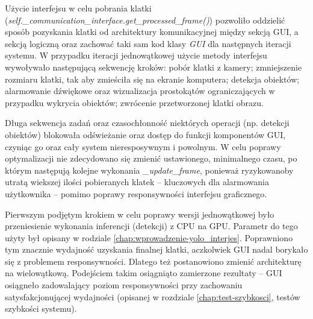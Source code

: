 Użycie interfejsu w celu pobrania klatki (\emph{self.\_communication\_interface.get\_processed\_frame()}) pozwoliło oddzielić sposób pozyskania klatki od architektury komunikacyjnej między sekcją GUI, a sekcją logiczną oraz zachować taki sam kod klasy \emph{GUI} dla następnych iteracji systemu. W przypadku iteracji jednowątkowej użycie metody interfejsu wywoływało następującą sekwencję kroków: pobór klatki z kamery; zmniejszenie rozmiaru klatki, tak aby zmieściła się na ekranie komputera; detekcja obiektów; alarmowanie dźwiękowe oraz wizualizacja prostokątów ograniczających w przypadku wykrycia obiektów; zwrócenie przetworzonej klatki obrazu.

Długa sekwencja zadań oraz czasochłonność niektórych operacji (np. detekcji obiektów) blokowała odświeżanie oraz dostęp do funkcji komponentów GUI, czyniąc go oraz cały system nieresposywnym i powolnym. W celu poprawy optymalizacji nie zdecydowano się zmienić ustawionego, minimalnego czasu, po którym następują kolejne wykonania \emph{\_update\_frame}, ponieważ ryzykowanoby utratą wiekszej ilości pobieranych klatek -- kluczowych dla alarmowania użytkownika -- pomimo poprawy responsywności interfejsu graficznego.

Pierwszym podjętym krokiem w celu poprawy wersji jednowątkowej było przeniesienie wykonania inferencji (detekcji) z CPU na GPU. Parametr do tego użyty był opisany w rodziale \ref{chap:wprowadzenie-yolo_interjes}. Poprawniono tym znacznie wydajność uzyskania finalnej klatki, aczkolwiek GUI nadal borykało się z problemem responsywności. Dlatego też postanowiono zmienić architekturę na wielowątkową. Podejściem takim osiągniąto zamierzone rezultaty -- GUI osiągneło zadowalający poziom responsywności przy zachowaniu satysfakcjonującej wydajności (opisanej w rozdziale \ref{chap:test-szybkosci}, testów szybkości systemu). 